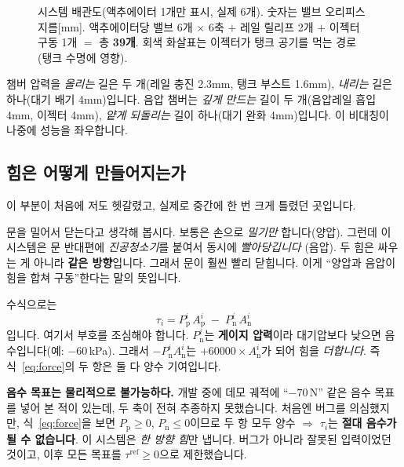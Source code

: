 \documentclass[11pt]{article}
\newcommand{\Ppos}{P_{\mathrm{p}}}
\newcommand{\Pneg}{P_{\mathrm{n}}}
\newcommand{\Apos}{A_{\mathrm{p}}}
\newcommand{\Aneg}{A_{\mathrm{n}}}
\begin{document}
\begin{figure}[h]
\caption{시스템 배관도(액추에이터 1개만 표시, 실제 6개). 숫자는 밸브 오리피스
지름[mm]. 액추에이터당 밸브 6개 $\times$ 6축 $+$ 레일 릴리프 2개 $+$ 이젝터 구동
1개 $=$ 총 \textbf{39개}. 회색 화살표는 이젝터가 탱크 공기를 먹는 경로(탱크 수명에
영향).}
\label{fig:sys}
\end{figure}

\begin{keybox}
챔버 압력을 \emph{올리는} 길은 두 개(레일 충진 2.3mm, 탱크 부스트 1.6mm),
\emph{내리는} 길은 하나(대기 배기 4mm)입니다. 음압 챔버는 \emph{깊게 만드는} 길이
두 개(음압레일 흡입 4mm, 이젝터 4mm), \emph{얕게 되돌리는} 길이 하나(대기 완화
4mm)입니다. 이 비대칭이 나중에 성능을 좌우합니다.
\end{keybox}

\subsection{힘은 어떻게 만들어지는가}

이 부분이 처음에 저도 헷갈렸고, 실제로 중간에 한 번 크게 틀렸던 곳입니다.

\begin{analogy}
문을 밀어서 닫는다고 생각해 봅시다. 보통은 손으로 \emph{밀기만} 합니다(양압).
그런데 이 시스템은 문 반대편에 \emph{진공청소기}를 붙여서 동시에 \emph{빨아당깁니다}
(음압). 두 힘은 싸우는 게 아니라 \textbf{같은 방향}입니다. 그래서 문이 훨씬 빨리
닫힙니다. 이게 ``양압과 음압이 힘을 합쳐 구동''한다는 말의 뜻입니다.
\end{analogy}

수식으로는
\begin{equation}
\tau_i = \Ppos^i\,\Apos^i \;-\; \Pneg^i\,\Aneg^i
\label{eq:force}
\end{equation}
입니다. 여기서 부호를 조심해야 합니다. $\Pneg^i$는 \textbf{게이지 압력}이라
대기압보다 낮으면 음수입니다(예: $-60$\,kPa). 그래서 $-\Pneg^i\Aneg^i$는
$+60000 \times \Aneg^i$가 되어 힘을 \emph{더합니다}. 즉 식~\eqref{eq:force}의 두 항은
둘 다 양수 기여입니다.

\begin{pitfall}
\textbf{음수 목표는 물리적으로 불가능하다.} 개발 중에 데모 궤적에 ``$-70$\,N''
같은 음수 목표를 넣어 본 적이 있는데, 두 축이 전혀 추종하지 못했습니다. 처음엔
버그를 의심했지만, 식~\eqref{eq:force}을 보면 $\Ppos\ge0$, $\Pneg\le0$이므로 두 항
모두 양수 $\Rightarrow$ $\tau_i$는 \textbf{절대 음수가 될 수 없습니다}. 이 시스템은
\emph{한 방향 힘}만 냅니다. 버그가 아니라 잘못된 입력이었던 것이고, 이후 모든 목표를
$\tau^{\mathrm{ref}}\ge 0$으로 제한했습니다.
\end{pitfall}
\end{document}
